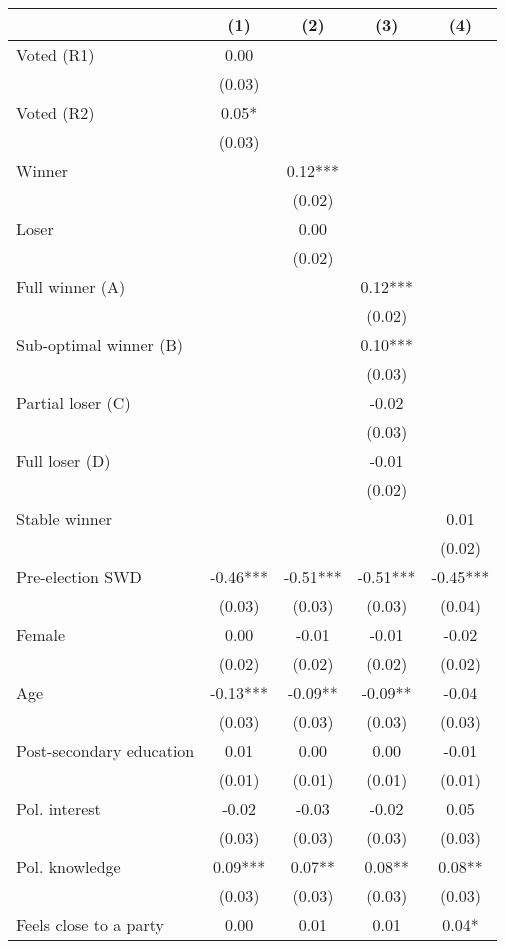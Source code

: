 \begin{table}
\centering
\begin{tabular}[t]{lcccc}
\toprule
  & (1) & (2) & (3) & (4)\\
\midrule
Voted (R1) & 0.00 &  &  & \\
 & (0.03) &  &  \vphantom{1} & \\
Voted (R2) & 0.05* &  &  & \\
 & (0.03) &  &  & \\
Winner &  & 0.12*** &  & \\
 &  & (0.02) &  \vphantom{1} & \\
Loser &  & 0.00 &  & \\
 &  & (0.02) &  & \\
Full winner (A) &  &  & 0.12*** & \\
 &  &  & (0.02) \vphantom{1} & \\
Sub-optimal winner (B) &  &  & 0.10*** & \\
 &  &  & (0.03) \vphantom{1} & \\
Partial loser (C) &  &  & -0.02 & \\
 &  &  & (0.03) & \\
Full loser (D) &  &  & -0.01 & \\
 &  &  & (0.02) & \\
Stable winner &  &  &  & 0.01\\
 &  &  &  & (0.02)\\
Pre-election SWD & -0.46*** & -0.51*** & -0.51*** & -0.45***\\
 & (0.03) & (0.03) & (0.03) & (0.04)\\
Female & 0.00 & -0.01 & -0.01 & -0.02\\
 & (0.02) & (0.02) & (0.02) & \vphantom{2} (0.02)\\
Age & -0.13*** & -0.09** & -0.09** & -0.04\\
 & (0.03) & (0.03) & (0.03) & \vphantom{2} (0.03)\\
Post-secondary education & 0.01 & 0.00 & 0.00 & -0.01\\
 & (0.01) & (0.01) & (0.01) & (0.01)\\
Pol. interest & -0.02 & -0.03 & -0.02 & 0.05\\
 & (0.03) & (0.03) & (0.03) & \vphantom{1} (0.03)\\
Pol. knowledge & 0.09*** & 0.07** & 0.08** & 0.08**\\
 & (0.03) & (0.03) & (0.03) & (0.03)\\
Feels close to a party & 0.00 & 0.01 & 0.01 & 0.04*\\

\end{tabular}
\end{table}
